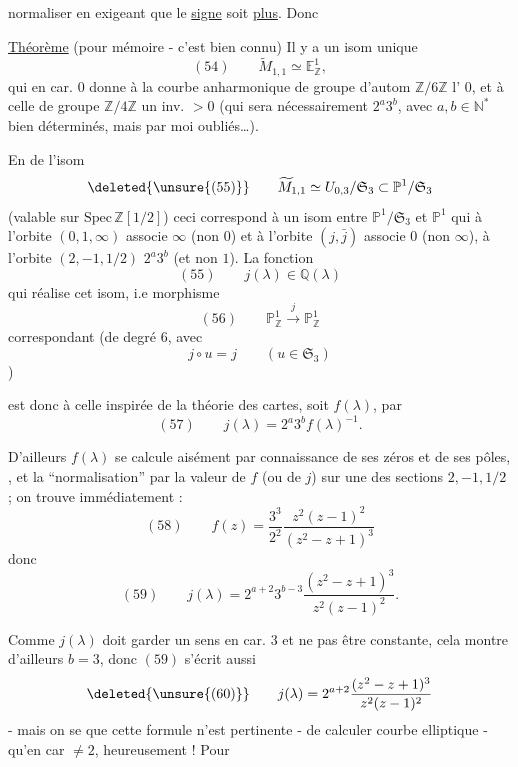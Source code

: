
normaliser en exigeant que le \uline{signe} soit \uline{plus}. Donc

\uline{Théorème} (pour mémoire - c'est bien connu) Il y a un isom unique
\[
(54)\qquad
\widetilde M_{1,1}\simeq\mathbb E^1_{\mathbb Z},
\]
qui  en car. $0$ donne à la courbe anharmonique de groupe
d'autom $\mathbb Z/6\mathbb Z$
l' $0$, et à celle de
groupe $\mathbb Z/4\mathbb Z$ un inv.  $>0$
(qui sera nécessairement $2^a3^b$, avec $a,b\in\mathbb N^*$ bien
déterminés, mais par moi oubliés\ldots).

En  de l'isom
\[
\deleted{\unsure{(55)}}\qquad
\widetilde M_{1,1}\simeq U_{0,3}/\mathfrak S_3
\subset \mathbb P^1/\mathfrak S_3
\]
(valable sur $\mathrm{Spec}\,\mathbb Z[1/2]$)
ceci correspond à  un isom entre
$\mathbb P^1/\mathfrak S_3$ et $\mathbb P^1$ qui à l'orbite
$(0,1,\infty)$ associe $\infty$ (non $0$) et à l'orbite $(j,\bar j)$
associe $0$ (non $\infty$), à l'orbite $(2,-1,1/2)$
 $2^a3^b$ (et non $1$). La fonction
\[
(55)\qquad j(\lambda)\in\mathbb Q(\lambda)
\]
qui réalise cet isom, i.e   morphisme
\[
(56)\qquad
\mathbb P^1_{\mathbb Z}\xrightarrow{j}\mathbb P^1_{\mathbb Z}
\]
correspondant (de degré $6$, avec
\[
j\circ u=j
\qquad(u\in\mathfrak S_3)
\]
)


est donc  à celle inspirée de la théorie des cartes,
soit $f(\lambda)$, par
\[
(57)\qquad
j(\lambda)=2^a3^b f(\lambda)^{-1}.
\]

D'ailleurs $f(\lambda)$  se calcule aisément
par connaissance de ses zéros et de ses pôles,
,
 et la ``normalisation'' par la valeur de $f$
(ou de $j$) sur une des sections $2,-1,1/2$ ; on trouve immédiatement :
\[
(58)\qquad
f(z)=\frac{3^3}{2^2}\frac{z^2(z-1)^2}{(z^2-z+1)^3}
\]
donc
\[
(59)\qquad
j(\lambda)=2^{a+2}3^{b-3}\frac{(z^2-z+1)^3}{z^2(z-1)^2}.
\]

Comme $j(\lambda)$ doit garder un sens en car. $3$ et ne pas être
constante, cela montre d'ailleurs \uline{$b=3$}, donc $(59)$ s'écrit aussi
\[
\deleted{\unsure{(60)}}\qquad
j(\lambda)=2^{a+2}\frac{(z^2-z+1)^3}{z^2(z-1)^2}
\]
- mais on se  que cette formule n'est pertinente -
 de calculer
courbe elliptique - qu'en car $\ne 2$, heureusement !
Pour 

